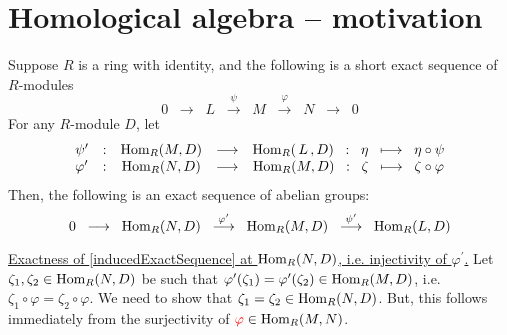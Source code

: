 

\section{Homological algebra -- motivation}
\setcounter{theorem}{0}
\setcounter{equation}{0}


\renewcommand{\theenumi}{\roman{enumi}}
\renewcommand{\labelenumi}{\textnormal{(\theenumi)}$\;\;$}


\begin{proposition}
\label{homologicalAlgebraMotivation}
\mbox{}
\vskip 0.1cm
\noindent
Suppose $R$ is a ring with identity, and the following is
a short exact sequence of $R$-modules
\begin{equation}\label{givenShortExactSequence}
0
\;\; \longrightarrow \;\;
	L
\;\; \overset{\psi}{\longrightarrow} \;\;
	M
\;\; \overset{\varphi}{\longrightarrow} \;\;
	N
\;\; \longrightarrow \;\;
	0
\end{equation}
For any $R$-module $D$, let 
\begin{equation*}
\begin{array}{lccccc}
\psi^{\prime} & : & \textnormal{Hom}_{R}(M,D) & \longrightarrow & \textnormal{Hom}_{R}(\,L\,,D) \;\; : \;\; \eta \;\; \longmapsto \;\; \eta \circ \psi
\\
\varphi^{\prime} & : & \textnormal{Hom}_{R}(N,D) & \longrightarrow & \textnormal{Hom}_{R}(M,D) \;\; : \;\; \zeta \;\; \longmapsto \;\; \zeta \circ \varphi
\end{array}
\end{equation*}
Then, the following is an exact sequence of abelian groups:
\begin{equation}\label{inducedExactSequence}
0
\;\; \longrightarrow \;\;
	\textnormal{Hom}_{R}(N,D)
\;\; \overset{\varphi^{\prime}}{\longrightarrow} \;\;
	\textnormal{Hom}_{R}(M,D)
\;\; \overset{\psi^{\prime}}{\longrightarrow} \;\;
	\textnormal{Hom}_{R}(L,D)
\end{equation}
\end{proposition}
\proof

\vskip 0.25cm
\noindent
\underline{Exactness of \eqref{inducedExactSequence} at $\textnormal{Hom}_{R}(N,D)$, i.e. {\color{red}injectivity of $\varphi^{\prime}$}{\color{white}.}}
\vskip 0.25cm
\noindent
Let $\zeta_{1}, \zeta_{2} \in \textnormal{Hom}_{R}(N,D)$ be such that
$\varphi^{\prime}(\zeta_{1}) = \varphi^{\prime}(\zeta_{2}) \in \textnormal{Hom}_{R}(M,D)$, i.e.
$\zeta_{1} \circ \varphi = \zeta_{2} \circ \varphi$.
We need to show that $\zeta_{1} = \zeta_{2} \in \textnormal{Hom}_{R}(N,D)$.
But, this follows immediately from the {\color{red}surjectivity of} ${\color{red}\varphi} \in \textnormal{Hom}_{R}(M,N)$.



